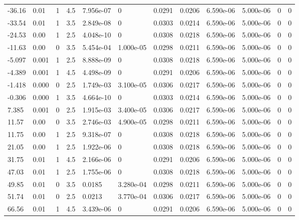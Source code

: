 \documentclass[preview]{standalone}
\begin{document}
{{\begin{tabular}{L{1.2cm}C{1.2cm} C{0.3cm}C{0.5cm} C{1.4cm}C{1.4cm} C{1.4cm}C{1.4cm} C{1.6cm}C{1.6cm} C{1.6cm}C{1.6cm}}
  -36.16  &  0.01  & 1     & 4.5 &  7.956e-07  & 0  &  0.0291&   0.0206& 6.590e-06 & 5.000e-06   &  0 & 0  \\ 
  -33.54  &  0.01  & 1     & 3.5 &  2.849e-08  & 0  &  0.0303&   0.0214& 6.590e-06 & 5.000e-06   &  0 & 0  \\ 
  -24.53  &  0.00  & 1     & 2.5 &  4.048e-10  & 0  &  0.0308&   0.0218& 6.590e-06 & 5.000e-06   &  0 & 0  \\ 
  -11.63  &  0.00  & 0     & 3.5 &  5.454e-04  & 1.000e-05  &  0.0298&   0.0211& 6.590e-06 & 5.000e-06   &  0 & 0  \\ 
  -5.097  &  0.001  & 1     & 2.5 &  8.888e-09  & 0  &  0.0308&   0.0218& 6.590e-06 & 5.000e-06   &  0 & 0  \\ 
  -4.389  &  0.001  & 1     & 4.5 &  4.498e-09  & 0  &  0.0291&   0.0206& 6.590e-06 & 5.000e-06   &  0 & 0  \\ 
  -1.418  &  0.000  & 0     & 2.5 &  1.749e-03  & 3.100e-05  &  0.0306&   0.0217& 6.590e-06 & 5.000e-06   &  0 & 0  \\ 
  -0.306  &  0.000  & 1     & 3.5 &  4.664e-10  & 0  &  0.0303&   0.0214& 6.590e-06 & 5.000e-06   &  0 & 0  \\ 
  7.385  &  0.001  & 0     & 2.5 &  1.915e-03  & 3.400e-05  &  0.0306&   0.0217& 6.590e-06 & 5.000e-06   &  0 & 0  \\ 
  11.57  &  0.00  & 0     & 3.5 &  2.746e-03  & 4.900e-05  &  0.0298&   0.0211& 6.590e-06 & 5.000e-06   &  0 & 0  \\ 
  11.75  &  0.00  & 1     & 2.5 &  9.318e-07  & 0  &  0.0308&   0.0218& 6.590e-06 & 5.000e-06   &  0 & 0  \\ 
  21.05  &  0.00  & 1     & 2.5 &  1.922e-06  & 0  &  0.0308&   0.0218& 6.590e-06 & 5.000e-06   &  0 & 0  \\ 
  31.75  &  0.01  & 1     & 4.5 &  2.166e-06  & 0  &  0.0291&   0.0206& 6.590e-06 & 5.000e-06   &  0 & 0  \\ 
  47.03  &  0.01  & 1     & 2.5 &  1.755e-06  & 0  &  0.0308&   0.0218& 6.590e-06 & 5.000e-06   &  0 & 0  \\ 
  49.85  &  0.01  & 0     & 3.5 &  0.0185  & 3.280e-04  &  0.0298&   0.0211& 6.590e-06 & 5.000e-06   &  0 & 0  \\ 
  51.74  &  0.01  & 0     & 2.5 &  0.0213  & 3.770e-04  &  0.0306&   0.0217& 6.590e-06 & 5.000e-06   &  0 & 0  \\ 
  66.56  &  0.01  & 1     & 4.5 &  3.439e-06  & 0  &  0.0291&   0.0206& 6.590e-06 & 5.000e-06   &  0 & 0  \\ 

\end{tabular}}}
\end{document}
